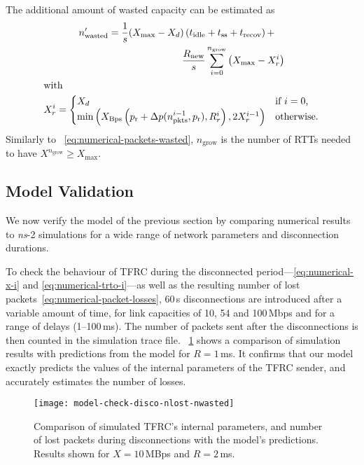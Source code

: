 \documentclass[twocolumn]{nictatechreport}
\newcommand{\ns}{\textit{ns}}
\begin{document}
The additional amount of wasted capacity can be estimated as 
\begin{gather}
    \label{eq:numerical-rate-bigger}
    n_\mathrm{wasted}^\prime = \begin{multlined}[t]
      \frac1s (X_\mathrm{max} - X_d) \left( t_\mathrm{idle} + t_\mathrm{ss} + t_\mathrm{recov} \right) + \\
      \frac{R_\mathrm{new}}s \sum_{i=0}^{n_\mathrm{grow}} \left(X_\mathrm{max} - X_r^i \right)
    \end{multlined} \\
  \intertext{with}
  X_r^i = \begin{cases}
    X_d & \text{if $i=0$,}\\
    \min\left(X_\mathrm{Bps} \left( p_\mathrm{r} + \Delta p(n_\mathrm{pkts}^{i-1}, p_\mathrm{r}),R^i_r \right), 2X_r^{i-1} \right) & \text{otherwise.}
  \end{cases}
\end{gather}
Similarly to ~\eqref{eq:numerical-packets-wasted}, $n_\mathrm{grow}$ is the
number of RTTs needed to have $X^{n_\mathrm{grow}} \ge
X_\mathrm{max}$.

\subsection{Model Validation}

We now verify the model of the previous section by comparing numerical
results to \ns-2 simulations for a wide range of network parameters and
disconnection durations.

To check the behaviour of TFRC during the disconnected
period---\eqref{eq:numerical-x-i} and \eqref{eq:numerical-trto-i}---as well as
the resulting number of lost packets~\eqref{eq:numerical-packet-losses}, 60\,s
disconnections are introduced after a variable amount of time, for link
capacities of 10, 54 and 100\,Mbps and for a range of delays (1--100\,ms).  The
number of packets sent after the disconnections is then counted in the
simulation trace file.  \figurename~\ref{fig:model-check-disco-nlost-nwasted}
shows a comparison of simulation results with predictions from the model for
$R=1$\,ms. It confirms that our model exactly predicts the values of the internal
parameters of the TFRC sender, and accurately estimates the number of losses.

\begin{figure}[tb]
  \begin{center}
    \texttt{[image: model-check-disco-nlost-nwasted]}
  \end{center}

  \caption[TFRC model validation (internal parameters, lost packets and wasted
  capacity)]{Comparison of simulated TFRC's internal parameters, and number of
  lost packets during disconnections with the model's predictions. Results shown
  for $X=10$\,MBps and $R=2$\,ms.}

  \label{fig:model-check-disco-nlost-nwasted}
\end{figure}
\end{document}

